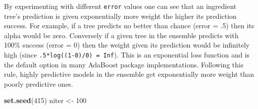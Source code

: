 \documentclass[]{tufte-handout}
\newenvironment{Shaded}{}{}
\newcommand{\KeywordTok}[1]{\textcolor[rgb]{0.00,0.44,0.13}{\textbf{#1}}}
\newcommand{\DecValTok}[1]{\textcolor[rgb]{0.25,0.63,0.44}{#1}}
\newcommand{\StringTok}[1]{\textcolor[rgb]{0.25,0.44,0.63}{#1}}
\newcommand{\NormalTok}[1]{#1}
\begin{document}
By experimenting with different \texttt{error} values one can see that
an ingredient tree's prediction is given exponentially more weight the
higher its prediction success. For example, if a tree predicts no better
than chance (error = .5) then its alpha would be zero. Conversely if a
given tree in the ensemble predicts with 100\% success (error = 0) then
the weight given its prediction would be infinitely high (since
\texttt{.5*log((1-0)/0)\ =\ Inf}). This is an exponential loss function
and is the default option in many AdaBoost package implementations.
Following this rule, highly predictive models in the ensemble get
exponentially more weight than poorly predictive ones.

\begin{Shaded}
\begin{Highlighting}[]
\KeywordTok{set.seed}\NormalTok{(}\DecValTok{415}\NormalTok{)}
\NormalTok{niter <-}\StringTok{ }\DecValTok{100}


\end{Highlighting}
\end{Shaded}
\end{document}
